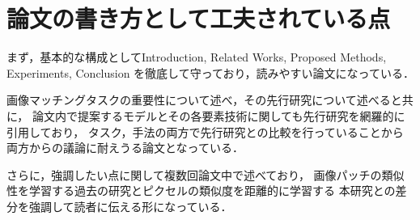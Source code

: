 \section{論文の書き方として工夫されている点}

まず，基本的な構成としてIntroduction, Related Works, Proposed Methods, Experiments, Conclusion
を徹底して守っており，読みやすい論文になっている．

画像マッチングタスクの重要性について述べ，その先行研究について述べると共に，
論文内で提案するモデルとその各要素技術に関しても先行研究を網羅的に引用しており，
タスク，手法の両方で先行研究との比較を行っていることから両方からの議論に耐えうる論文となっている．

さらに，強調したい点に関して複数回論文中で述べており，
画像パッチの類似性を学習する過去の研究とピクセルの類似度を距離的に学習する
本研究との差分を強調して読者に伝える形になっている．
